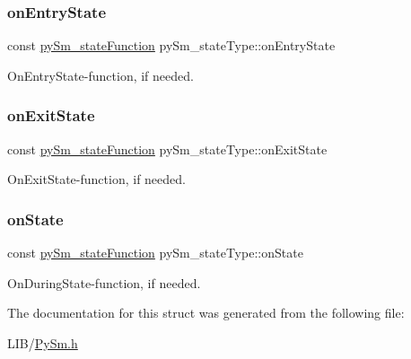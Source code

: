 \subsubsection{\texorpdfstring{on\+Entry\+State}{onEntryState}}
{\footnotesize\ttfamily const \hyperlink{PySm_8h_a4f768845ccbe1d4a74cabced29df0c9f}{py\+Sm\+\_\+state\+Function} py\+Sm\+\_\+state\+Type\+::on\+Entry\+State}

On\+Entry\+State-\/function, if needed. \mbox{\label{structpySm__stateType_aba503ee3ae11c3303088c94fa30d30d0}} 
\subsubsection{\texorpdfstring{on\+Exit\+State}{onExitState}}
{\footnotesize\ttfamily const \hyperlink{PySm_8h_a4f768845ccbe1d4a74cabced29df0c9f}{py\+Sm\+\_\+state\+Function} py\+Sm\+\_\+state\+Type\+::on\+Exit\+State}

On\+Exit\+State-\/function, if needed. \mbox{\label{structpySm__stateType_a189eccdfa6bcafd4964b27834edb38c8}} 
\subsubsection{\texorpdfstring{on\+State}{onState}}
{\footnotesize\ttfamily const \hyperlink{PySm_8h_a4f768845ccbe1d4a74cabced29df0c9f}{py\+Sm\+\_\+state\+Function} py\+Sm\+\_\+state\+Type\+::on\+State}

On\+During\+State-\/function, if needed. 

The documentation for this struct was generated from the following file\+:\begin{DoxyCompactItemize}
\item 
L\+I\+B/\hyperlink{PySm_8h}{Py\+Sm.\+h}\end{DoxyCompactItemize}
